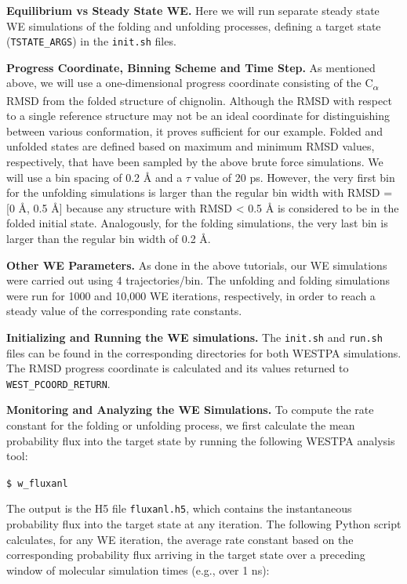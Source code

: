\documentclass[9pt,tutorial]{livecoms}
\begin{document}
\textbf{Equilibrium vs Steady State WE.} Here we will run separate steady state WE simulations of the folding and unfolding processes, defining a target state (\verb|TSTATE_ARGS|) in the \verb|init.sh| files.

\textbf{Progress Coordinate, Binning Scheme and Time Step.} As mentioned above, we will use a one-dimensional progress coordinate consisting of the C\textsubscript{$\alpha$} RMSD from the folded structure of chignolin. 
Although the RMSD with respect to a single reference structure may not be an ideal coordinate for distinguishing between  various conformation, it proves sufficient for our example. 
Folded and unfolded states are defined based on maximum and minimum RMSD values, respectively, that have been sampled by the above brute force simulations. 
We will use a bin spacing  of 0.2 \AA{} and a $\tau$ value of 20 ps. 
However, the very first bin for the unfolding simulations is larger than the regular bin width with RMSD = [0 \AA, 0.5 \AA] because any structure with RMSD < 0.5 \AA{} is considered to be in the folded initial state. 
Analogously, for the folding simulations, the very last bin is larger than the regular bin width of 0.2 \AA. 
  
\textbf{Other WE Parameters.} As done in the above tutorials, our WE simulations were carried out using 4 trajectories/bin. 
The unfolding and folding simulations were run for 1000 and 10,000 WE iterations, respectively, in order to reach a steady value of the corresponding rate constants. 
 
\textbf{Initializing and Running the WE simulations.} The \verb|init.sh| and \verb|run.sh| files can be found in the corresponding directories for both WESTPA simulations. 
The RMSD progress coordinate is calculated and its values returned to \verb|WEST_PCOORD_RETURN|.   

\textbf{Monitoring and Analyzing the WE Simulations.} To compute the rate constant for the folding or unfolding process, we first calculate the mean probability flux into the target state by running the following WESTPA analysis tool:
 
\verb|$ w_fluxanl|
 
The output is the H5 file \verb|fluxanl.h5|, which contains the instantaneous probability flux into the target state at any iteration. 
The following Python script calculates, for any WE iteration, the average rate constant based on the corresponding probability flux arriving in the target state over a preceding window of molecular simulation times (e.g., over 1 ns):
 
\end{document}
